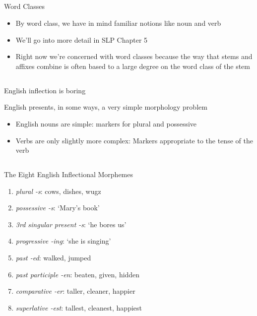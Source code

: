 \documentclass[9pt,xcolor=pdftex,dvipsnames,table]{beamer}
\begin{document}
\subsection{}
\begin{frame}{Word Classes}
	\begin{itemize}
		\item  By word class, we have in mind familiar notions like noun and verb
		\item  We'll go into more detail in SLP Chapter 5
		\item  Right now we're concerned with word classes because the way that stems and affixes combine is often based to a large degree on the word class of the stem
	\end{itemize}
\end{frame}

\subsection{}
\begin{frame}{English inflection is boring}

	{\large English presents, in some ways, a very simple morphology problem}
	\vspace{1cm}
	\begin{itemize}
		\item English nouns are simple: markers for plural and possessive
		\item Verbs are only slightly more complex: Markers appropriate to the tense of the verb
	\end{itemize}
\end{frame}

\subsection{}
\begin{frame}{The Eight English Inflectional Morphemes}
	\begin{enumerate}
		\item \emph{plural -s}: \hfill cows, dishes, wugz
		\item \emph{possessive -s}: \hfill `Mary's book'
		\item \emph{3rd singular present -s}: \hfill `he bores us'
		\item \emph{progressive -ing}: \hfill `she is singing'
		\item \emph{past -ed}: \hfill walked, jumped
		\item \emph{past participle -en}: \hfill beaten, given, hidden
		\item \emph{comparative -er}: \hfill taller, cleaner, happier
		\item \emph{superlative -est}: \hfill tallest, cleanest, happiest
	\end{enumerate}
\end{frame}
\end{document}
